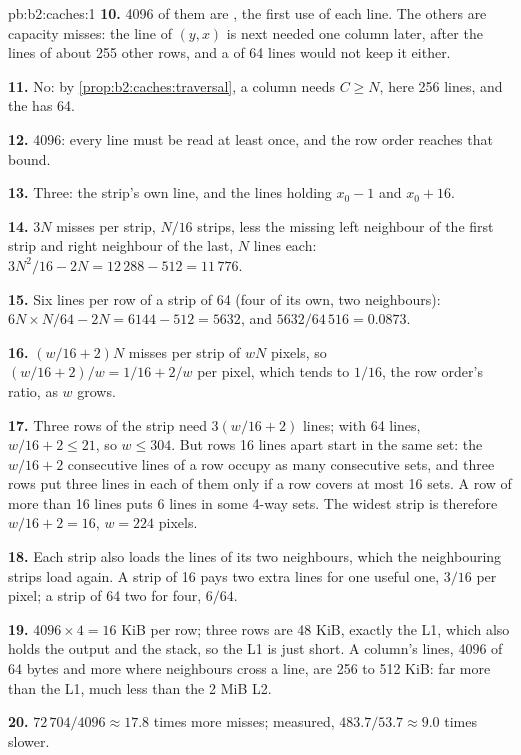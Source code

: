 \begin{solution}{pb:b2:caches:1}
\textbf{10.} 4096 of them are , the first use of each line. The others are capacity misses: the line of
$(y, x)$ is next needed one column later, after the lines of about 255 other rows, and a  of
64 lines would not keep it either.

\textbf{11.} No: by \cref{prop:b2:caches:traversal}, a column needs $C \ge N$, here 256 lines, and the  has 64.

\textbf{12.} 4096: every line must be read at least once, and the row order reaches that bound.

\textbf{13.} Three: the strip's own line, and the lines holding $x_0 - 1$ and $x_0 + 16$.

\textbf{14.} $3N$ misses per strip, $N / 16$ strips, less the missing left neighbour of the first strip and right
neighbour of the last, $N$ lines each: $3N^2/16 - 2N = 12\,288 - 512 = 11\,776$.

\textbf{15.} Six lines per row of a strip of 64 (four of its own, two neighbours): $6N \times N/64 - 2N =
6144 - 512 = 5632$, and $5632 / 64\,516 = 0.0873$.

\textbf{16.} $(w/16 + 2) N$ misses per strip of $w N$ pixels, so $(w/16 + 2)/w = 1/16 + 2/w$ per pixel, which tends to
$1/16$, the row order's ratio, as $w$ grows.

\textbf{17.} Three rows of the strip need $3(w/16 + 2)$ lines; with 64 lines, $w/16 + 2 \le 21$, so $w \le 304$.
But rows 16 lines apart start in the same set: the $w/16 + 2$ consecutive lines of a row occupy as many consecutive
sets, and three rows put three lines in each of them only if a row covers at most 16 sets. A row of more than 16
lines puts 6 lines in some 4-way sets. The widest strip is therefore $w/16 + 2 = 16$, $w = 224$ pixels.

\textbf{18.} Each strip also loads the lines of its two neighbours, which the neighbouring strips load again. A strip
of 16 pays two extra lines for one useful one, $3/16$ per pixel; a strip of 64 two for four, $6/64$.

\textbf{19.} $4096 \times 4 = 16$ KiB per row; three rows are 48 KiB, exactly the L1, which also holds the output
and the stack, so the L1 is just short. A column's lines, 4096 of 64 bytes and more where neighbours cross a line,
are 256 to 512 KiB: far more than the L1, much less than the 2 MiB L2.

\textbf{20.} $72\,704 / 4096 \approx 17.8$ times more misses; measured, $483.7 / 53.7 \approx 9.0$ times slower.


\end{solution}
